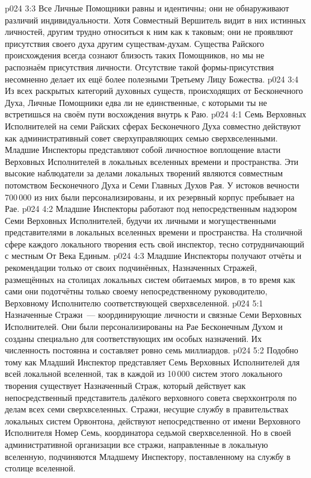 \vs p024 3:3 Все Личные Помощники равны и идентичны; они не обнаруживают различий индивидуальности. Хотя Совместный Вершитель видит в них истинных личностей, другим трудно относиться к ним как к таковым; они не проявляют присутствия своего духа другим существам\hyp{}духам. Существа Райского происхождения всегда сознают близость таких Помощников, но мы не распознаём присутствия личности. Отсутствие такой формы\hyp{}присутствия несомненно делает их ещё более полезными Третьему Лицу Божества.
\vs p024 3:4 Из всех раскрытых категорий духовных существ, происходящих от Бесконечного Духа, Личные Помощники едва ли не единственные, с которыми ты не встретишься на своём пути восхождения внутрь к Раю.
\vs p024 4:1 Семь Верховных Исполнителей на семи Райских сферах Бесконечного Духа совместно действуют как административный совет сверхуправляющих семью сверхвселенными. Младшие Инспекторы представляют собой личностное воплощение власти Верховных Исполнителей в локальных вселенных времени и пространства. Эти высокие наблюдатели за делами локальных творений являются совместным потомством Бесконечного Духа и Семи Главных Духов Рая. У истоков вечности 700\,000 из них были персонализированы, и их резервный корпус пребывает на Рае.
\vs p024 4:2 Младшие Инспекторы работают под непосредственным надзором Семи Верховных Исполнителей, будучи их личными и могущественными представителями в локальных вселенных времени и пространства. На столичной сфере каждого локального творения есть свой инспектор, тесно сотрудничающий с местным От Века Единым.
\vs p024 4:3 Младшие Инспекторы получают отчёты и рекомендации только от своих подчинённых, Назначенных Стражей, размещённых на столицах локальных систем обитаемых миров, в то время как сами они подотчётны только своему непосредственному руководителю, Верховному Исполнителю соответствующей сверхвселенной.
\vs p024 5:1 Назначенные Стражи~--- координирующие личности и связные Семи Верховных Исполнителей. Они были персонализированы на Рае Бесконечным Духом и созданы специально для соответствующих им особых назначений. Их численность постоянна и составляет ровно семь миллиардов.
\vs p024 5:2 Подобно тому как Младший Инспектор представляет Семь Верховных Исполнителей для всей локальной вселенной, так в каждой из 10\,000 систем этого локального творения существует Назначенный Страж, который действует как непосредственный представитель далёкого верховного совета сверхконтроля по делам всех семи сверхвселенных. Стражи, несущие службу в правительствах локальных систем Орвонтона, действуют непосредственно от имени Верховного Исполнителя Номер Семь, координатора седьмой сверхвселенной. Но в своей административной организации все стражи, направленные в локальную вселенную, подчиняются Младшему Инспектору, поставленному на службу в столице вселенной.
